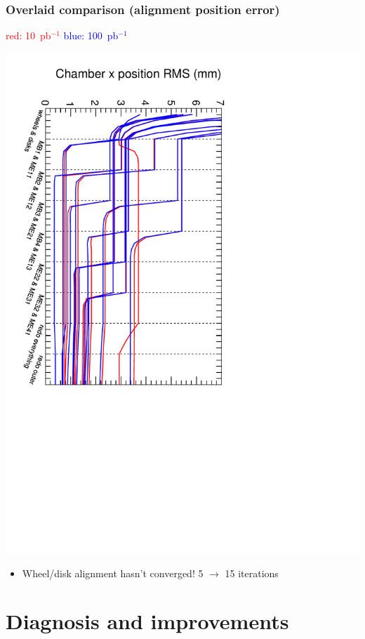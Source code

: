 \documentclass[compress]{beamer}
\begin{document}
\begin{frame}
\frametitle{Overlaid comparison (alignment position error)}

\begin{center} \textcolor{red}{red: 10~pb$^{-1}$} \hspace{0.5 cm} \textcolor{blue}{blue: 100~pb$^{-1}$}

\includegraphics[height=0.8\linewidth, angle=90]{convergence_overlay.pdf}

\end{center}

\vspace{-0.5 cm}
\begin{itemize}
\item Wheel/disk alignment hasn't converged!  5 $\to$ 15 iterations
\end{itemize}
\end{frame}

\section*{Diagnosis and improvements}
\end{document}
